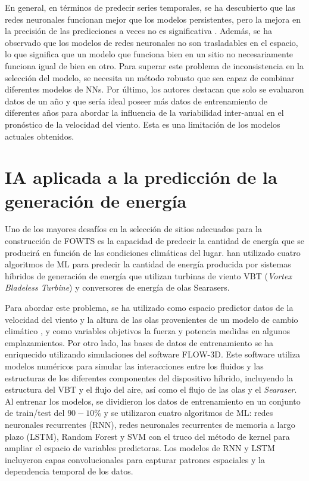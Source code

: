 \documentclass[12pt]{article}
\begin{document}
En general, en términos de predecir series temporales, se ha descubierto que las redes neuronales funcionan mejor que los modelos persistentes, pero la mejora en la precisión de las predicciones a veces no es significativa \citep{Lei,Sfetsos,Costa}.
Además, se ha observado que los modelos de redes neuronales no son trasladables en el espacio, lo que significa que un modelo que funciona bien en un sitio no necesariamente funciona igual de bien en otro. Para superar este problema de inconsistencia en la selección del modelo, se necesita un método robusto que sea capaz de combinar diferentes modelos de NNs. 
 Por último, los autores destacan  que solo se evaluaron datos de un año  y que sería ideal poseer más datos de entrenamiento de diferentes años para abordar la influencia de la variabilidad inter-anual en el pronóstico de la velocidad del viento. Esta es una limitación de los modelos actuales obtenidos.
 
\section{IA aplicada a la predicción de la generación de energía}
Uno de los mayores desafíos en la selección de sitios adecuados para la construcción de FOWTS  es la capacidad de predecir la cantidad de energía que se producirá en función de las condiciones climáticas del lugar. \citet{Mahsa} han utilizado cuatro algoritmos de ML para predecir la cantidad de energía producida por sistemas híbridos de generación de energía que utilizan turbinas de viento VBT (\textit{Vortex Bladeless Turbine}) y conversores de energía de olas Searasers. 

Para abordar este problema, se ha utilizado como espacio predictor datos de la velocidad del viento y la altura de las olas provenientes de un modelo de cambio climático \citep{He}, y como variables objetivos la fuerza y potencia medidas en algunos emplazamientos. Por otro lado, las bases de datos de entrenamiento se ha enriquecido utilizando simulaciones del software FLOW-3D. Este software utiliza modelos numéricos para simular las interacciones entre los fluidos y las estructuras de los diferentes componentes del dispositivo híbrido, incluyendo la estructura del VBT y el flujo del aire, así como el flujo de las olas y el \textit{Searaser}.
Al entrenar los modelos, se dividieron los datos de entrenamiento en un conjunto de train/test del $90-10 \%$ y se utilizaron cuatro algoritmos de ML:  redes neuronales recurrentes (RNN), redes neuronales recurrentes de memoria a largo plazo (LSTM), Random Forest y SVM con el truco del método de kernel para ampliar el espacio de variables predictoras. Los modelos de RNN y LSTM incluyeron capas convolucionales para capturar patrones espaciales y la dependencia temporal de los datos. 
\end{document}
